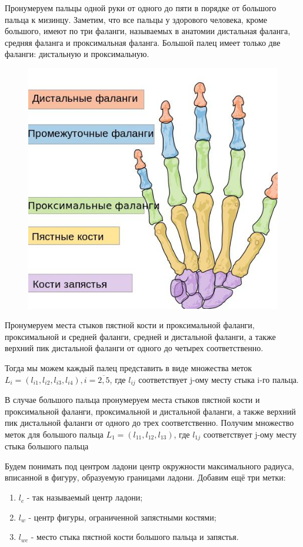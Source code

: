 \documentclass[12pt,a4paper]{article}
\theoremstyle{definition}
\begin{document}
Пронумеруем пальцы одной руки от одного до пяти в порядке от большого пальца к мизинцу. Заметим, что все пальцы у здорового человека, кроме большого, имеют по три фаланги, называемых в анатомии дистальная фаланга, средняя фаланга и проксимальная фаланга. Большой палец имеет только две фаланги: дистальную и проксимальную.
\begin{figure}[h] 
	\center 
	\includegraphics[scale=0.4]{falangs.jpeg} 
\end{figure}

Пронумеруем места стыков пястной кости и проксимальной фаланги, проксимальной и средней фаланги, средней и дистальной фаланги, а также верхний пик дистальной фаланги от одного до четырех соответственно.\par
Тогда мы можем каждый палец представить в виде множества меток $L_i = \left(l_{i1}, l_{i2}, l_{i3}, l_{i4}\right), i = \overline{2, 5}$, где $l_{ij}$ соответствует j-ому месту стыка i-го пальца.\par
В случае большого пальца пронумеруем места стыков пястной кости и проксимальной фаланги, проксимальной и дистальной фаланги, а также верхний пик дистальной фаланги от одного до трех соответственно. Получим множество меток для большого пальца $L_1 = \left(l_{11}, l_{12}, l_{13}\right)$, где $l_{1j}$ соответствует j-ому месту стыка большого пальца

Будем понимать под центром ладони центр окружности максимального радиуса, вписанной в фигуру, образуемую границами ладони. Добавим ещё три метки:
\begin{enumerate}
\item $l_c$ - так называемый центр ладони;
\item $l_w$ - центр фигуры, ограниченной запястными костями;
\item $l_{wc}$ - место стыка пястной кости большого пальца и запястья. 
\end{enumerate}
\end{document}
